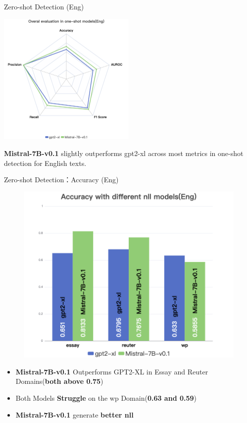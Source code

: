\documentclass[serif]{beamer}
\begin{document}
\begin{frame}{Zero-shot Detection (Eng)}

\centering
\includegraphics[width=0.5\textwidth]{images/Overal evaluation in one-shot models(Eng).png}

\vspace{-0.2em}
\begin{flushleft}
\scriptsize
\textbf{Mistral-7B-v0.1} slightly outperforms gpt2-xl across most metrics in one-shot detection for English texts.
\normalize
\end{flushleft}

\end{frame}

\begin{frame}{Zero-shot Detection：Accuracy (Eng)}
    \begin{figure}
        \centering
        \includegraphics[width=0.5\linewidth]{images/Accuracy with different nll models(Eng).png}
        \label{fig:enter-label}
    \end{figure}
    \begin{itemize}
    \item \textbf{Mistral-7B-v0.1} Outperforms GPT2-XL in Essay and Reuter Domains(\textbf{both above 0.75})
    \item Both Models \textbf{Struggle} on the wp Domain(\textbf{0.63 and 0.59})
    \item \textbf{Mistral-7B-v0.1} generate \textbf{better nll}
\end{itemize}
\end{frame}
\end{document}
